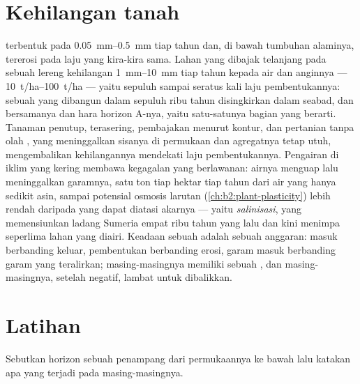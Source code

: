 \section{Kehilangan tanah}

\begin{proposition}\label{prop:b2:living-soil:erosion}
 terbentuk pada \qtyrange{0.05}{0.5}{mm} tiap tahun dan, di bawah
tumbuhan alaminya, tererosi pada laju yang kira-kira sama. Lahan yang
dibajak telanjang pada sebuah lereng kehilangan
\qtyrange{1}{10}{mm} tiap tahun kepada air dan anginnya ---
\qtyrange{10}{100}{t/ha} --- yaitu sepuluh sampai seratus kali laju
pembentukannya: sebuah  yang dibangun dalam sepuluh ribu tahun
disingkirkan dalam seabad, dan bersamanya  dan hara horizon
A-nya, yaitu satu-satunya bagian yang berarti. Tanaman penutup,
terasering, pembajakan menurut kontur, dan pertanian tanpa olah ,
yang meninggalkan sisanya di permukaan dan agregatnya tetap utuh,
mengembalikan kehilangannya mendekati laju pembentukannya. Pengairan di
iklim yang kering membawa kegagalan yang berlawanan: airnya menguap
lalu meninggalkan garamnya, satu ton tiap hektar tiap tahun dari air
yang hanya sedikit asin, sampai potensial osmosis larutan 
(\cref{ch:b2:plant-plasticity}) lebih rendah daripada yang dapat
diatasi akarnya --- yaitu \emph{salinisasi}, yang memensiunkan ladang
Sumeria empat ribu tahun yang lalu dan kini menimpa seperlima lahan
yang diairi. Keadaan sebuah  adalah sebuah anggaran:  masuk
berbanding  keluar, pembentukan berbanding erosi, garam masuk
berbanding garam yang teralirkan; masing-masingnya memiliki sebuah
, dan masing-masingnya, setelah negatif, lambat untuk
dibalikkan.
\end{proposition}

\section{Latihan}

\begin{exercise}[$\star$]\label{exo:b2:living-soil:1}
Sebutkan horizon sebuah penampang  dari permukaannya ke bawah
lalu katakan apa yang terjadi pada masing-masingnya.
\end{exercise}

